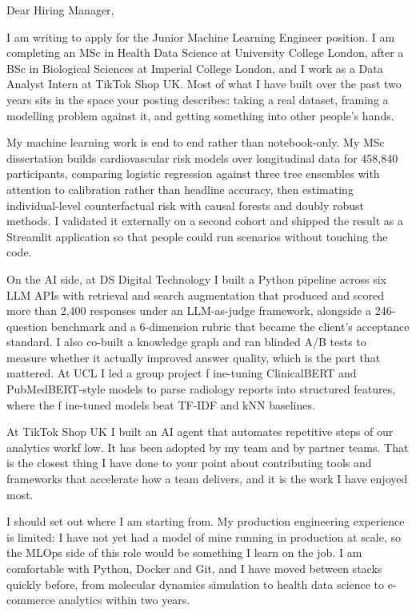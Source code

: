 \documentclass[letterpaper,11pt]{article}
\begin{document}
Dear Hiring Manager,

I am writing to apply for the Junior Machine Learning Engineer position. I am completing an MSc in Health Data Science at University College London, after a BSc in Biological Sciences at Imperial College London, and I work as a Data Analyst Intern at TikTok Shop UK. Most of what I have built over the past two years sits in the space your posting describes: taking a real dataset, framing a modelling problem against it, and getting something into other people's hands.

My machine learning work is end to end rather than notebook-only. My MSc dissertation builds cardiovascular risk models over longitudinal data for 458,840 participants, comparing logistic regression against three tree ensembles with attention to calibration rather than headline accuracy, then estimating individual-level counterfactual risk with causal forests and doubly robust methods. I validated it externally on a second cohort and shipped the result as a Streamlit application so that people could run scenarios without touching the code.

On the AI side, at DS Digital Technology I built a Python pipeline across six LLM APIs with retrieval and search augmentation that produced and scored more than 2,400 responses under an LLM-as-judge framework, alongside a 246-question benchmark and a 6-dimension rubric that became the client's acceptance standard. I also co-built a knowledge graph and ran blinded A/B tests to measure whether it actually improved answer quality, which is the part that mattered. At UCL I led a group project f\kern0pt ine-tuning ClinicalBERT and PubMedBERT-style models to parse radiology reports into structured features, where the f\kern0pt ine-tuned models beat TF-IDF and kNN baselines.

At TikTok Shop UK I built an AI agent that automates repetitive steps of our analytics workf\kern0pt low. It has been adopted by my team and by partner teams. That is the closest thing I have done to your point about contributing tools and frameworks that accelerate how a team delivers, and it is the work I have enjoyed most.

I should set out where I am starting from. My production engineering experience is limited: I have not yet had a model of mine running in production at scale, so the MLOps side of this role would be something I learn on the job. I am comfortable with Python, Docker and Git, and I have moved between stacks quickly before, from molecular dynamics simulation to health data science to e-commerce analytics within two years.
\end{document}

